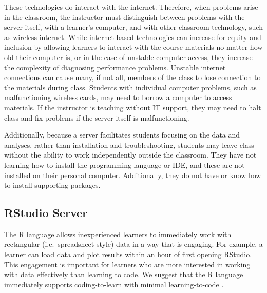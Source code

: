 These technologies do interact with the internet.
Therefore, when problems arise in the classroom, the instructor must distinguish between problems with the server itself, with a 
learner's computer, and with other classroom technology, such as wireless internet.
While internet-based technologies can increase for equity and inclusion by allowing learners to 
interact with the course materials no matter how old their computer is, or in the case of  unstable computer access, 
they increase the complexity of diagnosing performance problems.
Unstable internet connections can cause many, if not all, members of the class to lose connection to the materials during class.
Students with individual computer problems, such as malfunctioning wireless cards, may need to borrow a computer to access materials. 
If the instructor is teaching without IT support, they may need to halt class and fix problems if the server itself is malfunctioning.

Additionally, because a server facilitates students focusing on the data
and analyses, rather than installation and troubleshooting, students may leave
class without the ability to work independently outside the classroom.
They have not learning how to install the programming language or IDE, and these 
are not installed on their personal computer.
Additionally, they do not have or know how to install supporting packages.


\subsection{RStudio Server}\label{subsub:RStudio}

The R language allows inexperienced learners to immediately work with rectangular (i.e.\ spreadsheet-style) data in a way that is engaging. For example, a learner can load data and plot results within an hour of first opening RStudio. This engagement is important for learners who are more interested in working with data effectively than learning to code. We suggest that the R language immediately supports coding-to-learn with minimal learning-to-code \citep{}.

